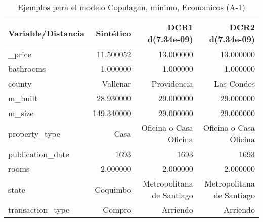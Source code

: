 \begin{table}[H]
\centering
\fontsize{10}{14}\selectfont
\caption{Ejemplos para el modelo Copulagan, minimo, Economicos (A-1)}
\label{table-example-economicos-a-1-copulagan-min}
\begin{tabular}{|l|r|r|r|}
\hline
\rowcolor[gray]{0.8}
Variable/Distancia & Sintético & DCR1 d(7.34e-09) & DCR2 d(7.34e-09) \\
\hline \_price & \cellcolor[rgb]{0.9, 0.54, 0.52} 11.500052 & 13.000000 & 13.000000 \\
\hline bathrooms & \cellcolor[rgb]{0.9, 0.54, 0.52} 1.000000 & \cellcolor[rgb]{0.9, 0.54, 0.52} 1.000000 & \cellcolor[rgb]{0.9, 0.54, 0.52} 1.000000 \\
\hline county & \cellcolor[rgb]{0.9, 0.54, 0.52} Vallenar & Providencia & Las Condes \\
\hline m\_built & \cellcolor[rgb]{0.9, 0.54, 0.52} 28.930000 & 29.000000 & 29.000000 \\
\hline m\_size & \cellcolor[rgb]{0.9, 0.54, 0.52} 149.340000 & 29.000000 & 29.000000 \\
\hline property\_type & \cellcolor[rgb]{0.9, 0.54, 0.52} Casa & Oficina o Casa Oficina & Oficina o Casa Oficina \\
\hline publication\_date & \cellcolor[rgb]{0.9, 0.54, 0.52} 1693 & \cellcolor[rgb]{0.9, 0.54, 0.52} 1693 & \cellcolor[rgb]{0.9, 0.54, 0.52} 1693 \\
\hline rooms & \cellcolor[rgb]{0.9, 0.54, 0.52} 2.000000 & \cellcolor[rgb]{0.9, 0.54, 0.52} 2.000000 & \cellcolor[rgb]{0.9, 0.54, 0.52} 2.000000 \\
\hline state & \cellcolor[rgb]{0.9, 0.54, 0.52} Coquimbo & Metropolitana de Santiago & Metropolitana de Santiago \\
\hline transaction\_type & \cellcolor[rgb]{0.9, 0.54, 0.52} Compro & Arriendo & Arriendo \\
\hline
\end{tabular}
\end{table}
